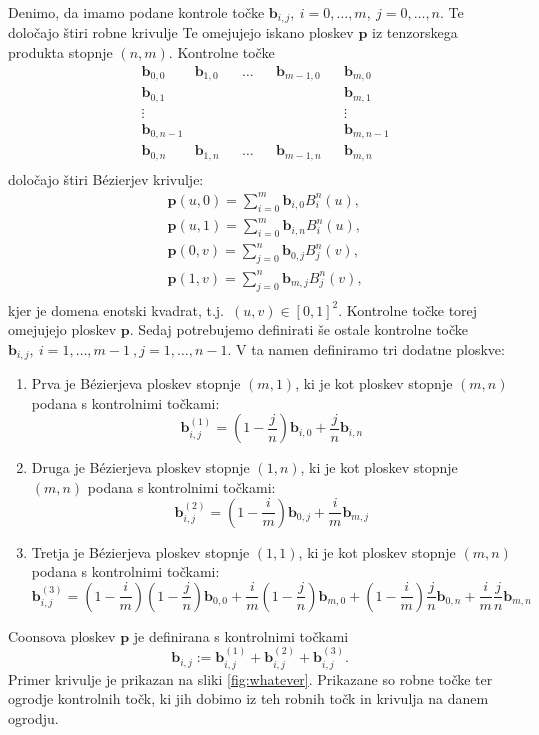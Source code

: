 \documentclass[a4paper,12pt]{article}
\begin{document}
Denimo, da imamo podane kontrole točke $\mathbf{b}_{i,j},~ i=0,\ldots,m,~ j=0,\ldots,n$.
Te določajo štiri robne krivulje 
Te omejujejo iskano ploskev $\mathbf{p}$ iz tenzorskega produkta stopnje $(n,m)$.
Kontrolne točke
\begin{align*}
      &\mathbf{b}_{0,0} &\mathbf{b}_{1,0} & &\ldots & &\mathbf{b}_{m-1,0} & &\mathbf{b}_{m,0} \\
      &\mathbf{b}_{0,1}  &  & &  & &  & &\mathbf{b}_{m,1} \\
      &\vdots  &  &  & &  & & &\vdots\\
      &\mathbf{b}_{0,n-1}  &  &  & &  & &  &\mathbf{b}_{m,n-1} \\ 
      &\mathbf{b}_{0,n} &\mathbf{b}_{1,n} & &\ldots & &\mathbf{b}_{m-1,n} & &\mathbf{b}_{m,n} \\
\end{align*}
določajo štiri Bézierjev krivulje: 
\begin{align*}
   &\mathbf{p}(u,0) =\sum_{i=0}^m \mathbf{b}_{i,0} B_i^n(u),  \\
   &\mathbf{p}(u,1) =\sum_{i=0}^m \mathbf{b}_{i,n} B_i^n(u),  \\
   &\mathbf{p}(0,v) =\sum_{j=0}^n \mathbf{b}_{0,j} B_j^n(v),  \\
   &\mathbf{p}(1,v) =\sum_{j=0}^n \mathbf{b}_{m,j} B_j^n(v),  \\
\end{align*}
kjer je domena enotski kvadrat, t.j.~$(u,v) \in [0,1]^2$.
Kontrolne točke torej omejujejo ploskev $\mathbf{p}$. 
Sedaj potrebujemo definirati še ostale kontrolne točke 
$\mathbf{b}_{i,j},~ i=1,\ldots, m-1~, j=1,\ldots,n-1$. 
V ta namen definiramo tri dodatne ploskve:
\begin{enumerate}
   \item Prva je Bézierjeva ploskev stopnje $(m, 1)$, ki je kot ploskev stopnje $(m,n)$ podana s kontrolnimi točkami:
   $$\mathbf{b}_{i,j}^{(1)} = \left(1-\frac{j}{n}  \right) \mathbf{b}_{i,0} + \frac{j}{n} \mathbf{b}_{i,n} $$
   \item Druga je Bézierjeva ploskev stopnje $(1, n)$, ki je kot ploskev stopnje $(m,n)$ podana s kontrolnimi točkami:
   $$\mathbf{b}_{i,j}^{(2)} = \left(1-\frac{i}{m}  \right) \mathbf{b}_{0,j} + \frac{i}{m} \mathbf{b}_{m,j} $$
   \item Tretja je Bézierjeva ploskev stopnje $(1, 1)$, ki je kot ploskev stopnje $(m,n)$ podana s kontrolnimi točkami:
   $$
   \mathbf{b}_{i,j}^{(3)} = \left(1-\frac{i}{m}  \right) \left(1-\frac{j}{n}  \right) \mathbf{b}_{0,0} 
         + \frac{i}{m} \left(1-\frac{j}{n}  \right) \mathbf{b}_{m,0}
         + \left(1-\frac{i}{m}  \right) \frac{j}{n}  \mathbf{b}_{0,n} 
         + \frac{i}{m} \frac{j}{n} \mathbf{b}_{m,n} 
   $$
\end{enumerate}
Coonsova ploskev $\mathbf{p}$ je definirana s kontrolnimi točkami 
$$\mathbf{b}_{i,j} := \mathbf{b}_{i,j}^{(1)}+\mathbf{b}_{i,j}^{(2)}+\mathbf{b}_{i,j}^{(3)}.$$
Primer krivulje je prikazan na sliki \ref{fig:whatever}. 
Prikazane so robne točke ter ogrodje kontrolnih točk, ki jih dobimo iz teh 
robnih točk in krivulja na danem ogrodju.
\end{document}
